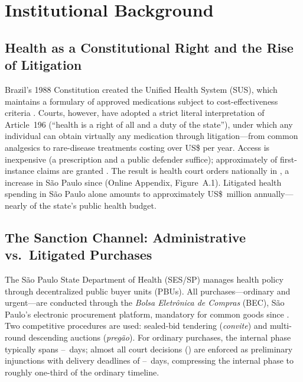 \section{Institutional Background}
\label{sec:institutional}

\subsection{Health as a Constitutional Right and the Rise of Litigation}
\label{sec:health_right}

Brazil's 1988 Constitution created the Unified Health System (SUS), which maintains a formulary of approved medications subject to cost-effectiveness criteria \citep{castro2019, soares2019}. Courts, however, have adopted a strict literal interpretation of Article~196 (``health is a right of all and a duty of the state''), under which any individual can obtain virtually any medication through litigation---from common analgesics to rare-disease treatments costing over US\$\BPrareDrugCostUSD{} per year. Access is inexpensive (a prescription and a public defender suffice); approximately \BPlitGrantedShare{} of first-instance claims are granted \citep{cnj2019judicializacao}. The result is \BPlitClaimsBR{} health court orders nationally in \BPcnjClaimsYear, a \BPspGrowthSince{} increase in S\~ao Paulo since \BPspGrowthBaseYear{} (Online Appendix, Figure~A.1). Litigated health spending in S\~ao Paulo alone amounts to approximately US\$\BPlitSpendingUSDmm~million annually---nearly \BPlitSpendingShare{} of the state's public health budget.

\subsection{The Sanction Channel: Administrative vs.\ Litigated Purchases}
\label{sec:sanction_channel}

The S\~ao Paulo State Department of Health (SES/SP) manages health policy through \BPpbuCount{} decentralized public buyer units (PBUs). All purchases---ordinary and urgent---are conducted through the \textit{Bolsa Eletr\^onica de Compras} (BEC), S\~ao Paulo's electronic procurement platform, mandatory for common goods since \BPbecMandatorySinceYear. Two competitive procedures are used: sealed-bid tendering (\textit{convite}) and multi-round descending auctions (\textit{preg\~ao}). For ordinary purchases, the internal phase typically spans \BPordPlanLow--\BPordPlanHigh~days; almost all court decisions (\BPinjunctionShare) are enforced as preliminary injunctions with delivery deadlines of \BPurgentPlanLow--\BPurgentPlanHigh~days, compressing the internal phase to roughly one-third of the ordinary timeline.

